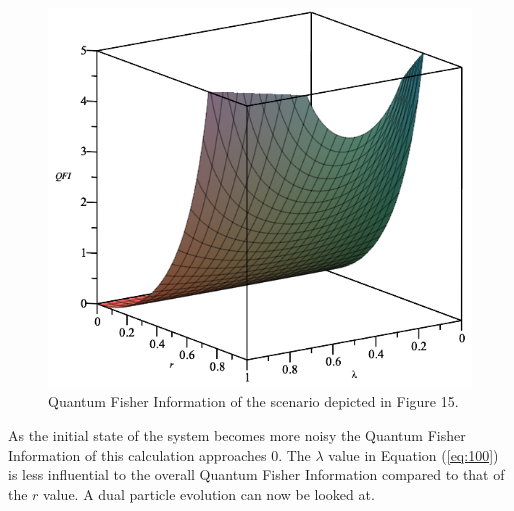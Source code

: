 \documentclass[twocolumn]{article}
\begin{document}
\newline
\begin{figure}[h]
\begin{center}
\includegraphics[width=0.65\linewidth]{Phase-Flip-Lambda-QFI-Graph.png}
\caption{Quantum Fisher Information of the scenario depicted in Figure 15.}
\end{center}
\end{figure}
\newline
As the initial state of the system becomes more noisy the Quantum Fisher Information of this calculation approaches $0$. The $\lambda$ value in Equation (\ref{eq:100}) is less influential to the overall Quantum Fisher Information compared to that of the $r$ value. A dual particle evolution can now be looked at.
\end{document}
